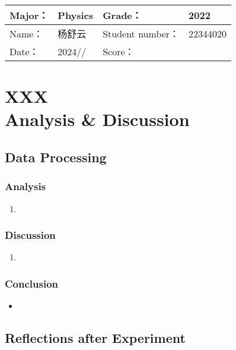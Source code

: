 
\begin{table}
	\renewcommand\arraystretch{1.7}
	\begin{tabularx}{\textwidth}{|X|X|X|X|}
		\hline
		Major：& Physics &Grade：& 2022\\
		\hline
		Name： & 杨舒云 & Student number：& 22344020\\
		\hline
		Date：& 2024// & Score： &\\
		\hline
	\end{tabularx}
\end{table}
\section{XXX \\ Analysis \& Discussion}


\subsection{Data Processing}

\subsubsection{Analysis}
\begin{enumerate}
	\item 
\end{enumerate}

\subsubsection{Discussion}
\begin{enumerate}
	\item 
\end{enumerate}

\subsubsection{Conclusion}
\begin{itemize}
	\item 
\end{itemize}


\subsection{Reflections after Experiment}

\begin{question}
	
\end{question}

\begin{question}
	
\end{question}

\begin{question}
	
\end{question}
